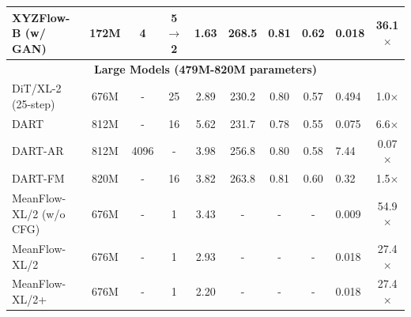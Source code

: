 \documentclass{article}
\theoremstyle{plain}
\theoremstyle{definition}
\theoremstyle{remark}
\begin{document}
\begin{table}[t]
{\begin{tabular}{ l | c | c c | c c | c c | l c}
        \rowcolor{gray!25} XYZFlow-B (w/ GAN) & 172M & 4 & 5$\rightarrow$2 & 1.63{\color{red}{\tiny$\downarrow$0.68}} & 268.5{\color{blue}{\tiny$\downarrow$13.2}} & 0.81{\color{blue}{\tiny$\downarrow$0.01}} & 0.62{\color{red}{\tiny$\uparrow$0.05}} & 0.018{\color{red}{\tiny$\downarrow$0.632}} & 36.1$\times${\color{red}{\tiny$\uparrow$35.1}} \\
        
        \midrule
        \multicolumn{10}{c}{\textbf{Large Models (479M-820M parameters)}} \\
        \midrule

        DiT/XL-2 (25-step) & 676M & - & 25 & 2.89 & 230.2 & 0.80 & 0.57 & 0.494 & 1.0$\times$ \\

        DART & 812M & - & 16 & 5.62{\color{blue}{\tiny$\uparrow$2.73}} & 231.7{\color{blue}{\tiny$\uparrow$1.5}} & 0.78{\color{blue}{\tiny$\downarrow$0.02}} & 0.55{\color{blue}{\tiny$\downarrow$0.02}} & 0.075{\color{red}{\tiny$\downarrow$0.419}} & 6.6$\times${\color{red}{\tiny$\uparrow$5.6}} \\
        DART-AR~\cite{gu2024dartdenoisingautoregressivetransformer} & 812M & 4096 & - & 3.98{\color{blue}{\tiny$\uparrow$1.09}} & 256.8{\color{red}{\tiny$\uparrow$26.6}} & 0.80 & 0.58{\color{red}{\tiny$\uparrow$0.01}} & 7.44{\color{blue}{\tiny$\uparrow$6.946}} & 0.07$\times${\color{blue}{\tiny$\downarrow$0.93}} \\
        DART-FM & 820M & - & 16 & 3.82{\color{blue}{\tiny$\uparrow$0.93}} & 263.8{\color{red}{\tiny$\uparrow$33.6}} & 0.81{\color{red}{\tiny$\uparrow$0.01}} & 0.60{\color{red}{\tiny$\uparrow$0.03}} & 0.32{\color{blue}{\tiny$\uparrow$0.174}} & 1.5$\times${\color{red}{\tiny$\uparrow$0.5}} \\
        

        MeanFlow-XL/2 (w/o CFG) & 676M & - & 1 & 3.43{\color{blue}{\tiny$\uparrow$0.54}} & - & - & - & 0.009{\color{red}{\tiny$\downarrow$0.485}} & 54.9$\times${\color{red}{\tiny$\uparrow$53.9}} \\
        MeanFlow-XL/2 & 676M & - & 1 & 2.93{\color{blue}{\tiny$\uparrow$0.04}} & - & - & - & 0.018{\color{red}{\tiny$\downarrow$0.476}} & 27.4$\times${\color{red}{\tiny$\uparrow$26.4}} \\
        MeanFlow-XL/2+ & 676M & - & 1 & 2.20{\color{red}{\tiny$\downarrow$0.69}} & - & - & - & 0.018{\color{red}{\tiny$\downarrow$0.476}} & 27.4$\times${\color{red}{\tiny$\uparrow$26.4}} \\
        

\end{tabular}}
\end{table}
\end{document}
